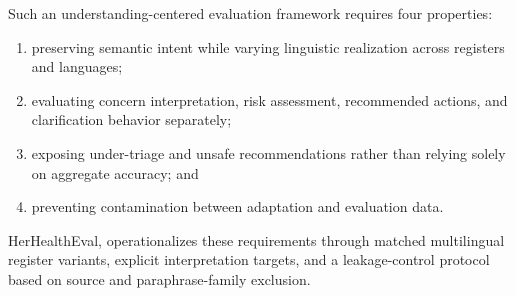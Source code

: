 Such an understanding-centered evaluation framework requires four properties:


\begin{enumerate}
    \item preserving semantic intent while varying linguistic realization
    across registers and languages;
    
    \item evaluating concern interpretation, risk assessment, recommended
    actions, and clarification behavior separately;
    
    \item exposing under-triage and unsafe recommendations rather than
    relying solely on aggregate accuracy; and
    
    \item preventing contamination between adaptation and evaluation data.
\end{enumerate}

HerHealthEval, operationalizes these requirements through matched multilingual
register variants, explicit interpretation targets, and a leakage-control
protocol based on source and paraphrase-family exclusion.

